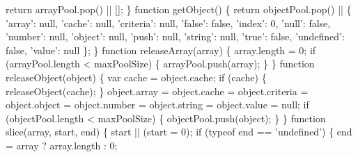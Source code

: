 \begin{DoxyCodeInclude}
\textcolor{stringliteral}{    return arrayPool.pop() || [];}
\textcolor{stringliteral}{  \}}
\textcolor{stringliteral}{}
\textcolor{stringliteral}{  function getObject() \{}
\textcolor{stringliteral}{    return objectPool.pop() || \{}
\textcolor{stringliteral}{      '}array\textcolor{stringliteral}{': null,}
\textcolor{stringliteral}{      '}cache\textcolor{stringliteral}{': null,}
\textcolor{stringliteral}{      '}criteria\textcolor{stringliteral}{': null,}
\textcolor{stringliteral}{      '}\textcolor{keyword}{false}\textcolor{stringliteral}{': false,}
\textcolor{stringliteral}{      '}index\textcolor{stringliteral}{': 0,}
\textcolor{stringliteral}{      '}null\textcolor{stringliteral}{': false,}
\textcolor{stringliteral}{      '}number\textcolor{stringliteral}{': null,}
\textcolor{stringliteral}{      '}\textcolor{keywordtype}{object}\textcolor{stringliteral}{': null,}
\textcolor{stringliteral}{      '}push\textcolor{stringliteral}{': null,}
\textcolor{stringliteral}{      '}\textcolor{keywordtype}{string}\textcolor{stringliteral}{': null,}
\textcolor{stringliteral}{      '}\textcolor{keyword}{true}\textcolor{stringliteral}{': false,}
\textcolor{stringliteral}{      '}undefined\textcolor{stringliteral}{': false,}
\textcolor{stringliteral}{      '}value\textcolor{stringliteral}{': null}
\textcolor{stringliteral}{    \};}
\textcolor{stringliteral}{  \}}
\textcolor{stringliteral}{}
\textcolor{stringliteral}{  function releaseArray(array) \{}
\textcolor{stringliteral}{    array.length = 0;}
\textcolor{stringliteral}{    if (arrayPool.length < maxPoolSize) \{}
\textcolor{stringliteral}{      arrayPool.push(array);}
\textcolor{stringliteral}{    \}}
\textcolor{stringliteral}{  \}}
\textcolor{stringliteral}{}
\textcolor{stringliteral}{  function releaseObject(object) \{}
\textcolor{stringliteral}{    var cache = object.cache;}
\textcolor{stringliteral}{    if (cache) \{}
\textcolor{stringliteral}{      releaseObject(cache);}
\textcolor{stringliteral}{    \}}
\textcolor{stringliteral}{    object.array = object.cache = object.criteria = object.object = object.number = object.string =
       object.value = null;}
\textcolor{stringliteral}{    if (objectPool.length < maxPoolSize) \{}
\textcolor{stringliteral}{      objectPool.push(object);}
\textcolor{stringliteral}{    \}}
\textcolor{stringliteral}{  \}}
\textcolor{stringliteral}{}
\textcolor{stringliteral}{  function slice(array, start, end) \{}
\textcolor{stringliteral}{    start || (start = 0);}
\textcolor{stringliteral}{    if (typeof end == '}undefined\textcolor{stringliteral}{') \{}
\textcolor{stringliteral}{      end = array ? array.length : 0;}

\end{DoxyCodeInclude}
